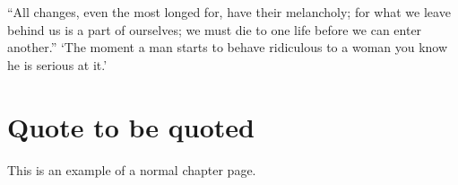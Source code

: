 \begin{savequote}[8cm]
	``All changes, even the most longed for, have their melancholy;
	for what we leave behind us is a part of ourselves; we must
	die to one life before we can enter another.''
	`The moment a man starts to behave ridiculous to a woman
	you know he is serious at it.'
\end{savequote}
\makeatletter
\chapter{Quote to be quoted}
This is an example of a normal chapter page.

%
%
%
